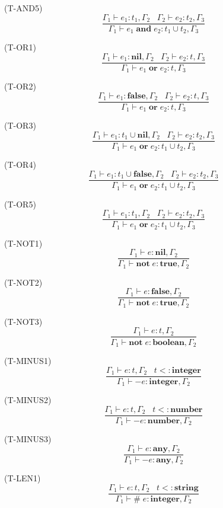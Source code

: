 \documentclass{paper}
\newcommand{\Any}{\mathbf{any}}
\newcommand{\Nil}{\mathbf{nil}}
\newcommand{\False}{\mathbf{false}}
\newcommand{\True}{\mathbf{true}}
\newcommand{\Boolean}{\mathbf{boolean}}
\newcommand{\Integer}{\mathbf{integer}}
\newcommand{\Number}{\mathbf{number}}
\newcommand{\String}{\mathbf{string}}
\newcommand{\mylabel}[1]{\; (\textsc{#1})}
\newcommand{\env}{\Gamma}
\newcommand{\subtype}{<:}
\begin{document}
\mylabel{T-AND5}
\[
\dfrac{\env_{1} \vdash e_{1}:t_{1}, \env_{2} \;\;\;
       \env_{2} \vdash e_{2}:t_{2}, \env_{3}}
      {\env_{1} \vdash e_{1} \; \mathbf{and} \; e_{2}:t_{1} \cup t_{2}, \env_{3}}
\]

\mylabel{T-OR1}
\[
\dfrac{\env_{1} \vdash e_{1}:\Nil, \env_{2} \;\;\;
       \env_{2} \vdash e_{2}:t, \env_{3}}
      {\env_{1} \vdash e_{1} \; \mathbf{or} \; e_{2}:t, \env_{3}}
\]

\mylabel{T-OR2}
\[
\dfrac{\env_{1} \vdash e_{1}:\False, \env_{2} \;\;\;
       \env_{2} \vdash e_{2}:t, \env_{3}}
      {\env_{1} \vdash e_{1} \; \mathbf{or} \; e_{2}:t, \env_{3}}
\]

\mylabel{T-OR3}
\[
\dfrac{\env_{1} \vdash e_{1}:t_{1} \cup \Nil, \env_{2} \;\;\;
       \env_{2} \vdash e_{2}:t_{2}, \env_{3}}
      {\env_{1} \vdash e_{1} \; \mathbf{or} \; e_{2}:t_{1} \cup t_{2}, \env_{3}}
\]

\mylabel{T-OR4}
\[
\dfrac{\env_{1} \vdash e_{1}:t_{1} \cup \False, \env_{2} \;\;\;
       \env_{2} \vdash e_{2}:t_{2}, \env_{3}}
      {\env_{1} \vdash e_{1} \; \mathbf{or} \; e_{2}:t_{1} \cup t_{2}, \env_{3}}
\]

\mylabel{T-OR5}
\[
\dfrac{\env_{1} \vdash e_{1}:t_{1}, \env_{2} \;\;\;
       \env_{2} \vdash e_{2}:t_{2}, \env_{3}}
      {\env_{1} \vdash e_{1} \; \mathbf{or} \; e_{2}:t_{1} \cup t_{2}, \env_{3}}
\]

\mylabel{T-NOT1}
\[
\dfrac{\env_{1} \vdash e:\Nil, \env_{2}}
      {\env_{1} \vdash \mathbf{not} \; e:\True, \env_{2}}
\]

\mylabel{T-NOT2}
\[
\dfrac{\env_{1} \vdash e:\False, \env_{2}}
      {\env_{1} \vdash \mathbf{not} \; e:\True, \env_{2}}
\]

\mylabel{T-NOT3}
\[
\dfrac{\env_{1} \vdash e:t, \env_{2}}
      {\env_{1} \vdash \mathbf{not} \; e:\Boolean, \env_{2}}
\]

\mylabel{T-MINUS1}
\[
\dfrac{\env_{1} \vdash e:t, \env_{2} \;\;\;
       t \subtype \Integer}
      {\env_{1} \vdash - e:\Integer, \env_{2}}
\]

\mylabel{T-MINUS2}
\[
\dfrac{\env_{1} \vdash e:t, \env_{2} \;\;\;
       t \subtype \Number}
      {\env_{1} \vdash - e:\Number, \env_{2}}
\]

\mylabel{T-MINUS3}
\[
\dfrac{\env_{1} \vdash e:\Any, \env_{2}}
      {\env_{1} \vdash - e:\Any, \env_{2}}
\]

\mylabel{T-LEN1}
\[
\dfrac{\env_{1} \vdash e:t, \env_{2} \;\;\;
       t \subtype \String}
      {\env_{1} \vdash \# \; e:\Integer, \env_{2}}
\]
\end{document}

